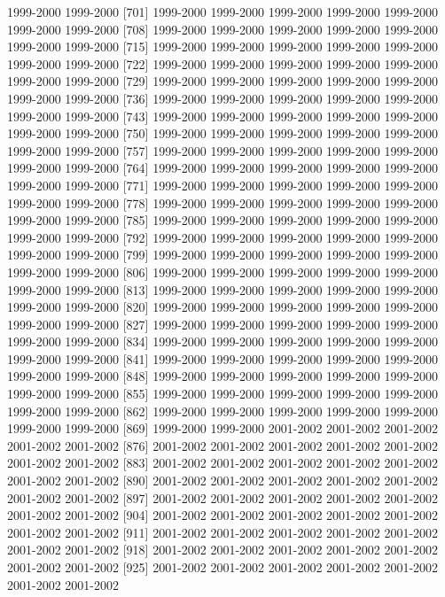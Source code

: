 \documentclass[
]{article}
\begin{document}
1999-2000 1999-2000 {[}701{]} 1999-2000 1999-2000 1999-2000 1999-2000
1999-2000 1999-2000 1999-2000 {[}708{]} 1999-2000 1999-2000 1999-2000
1999-2000 1999-2000 1999-2000 1999-2000 {[}715{]} 1999-2000 1999-2000
1999-2000 1999-2000 1999-2000 1999-2000 1999-2000 {[}722{]} 1999-2000
1999-2000 1999-2000 1999-2000 1999-2000 1999-2000 1999-2000 {[}729{]}
1999-2000 1999-2000 1999-2000 1999-2000 1999-2000 1999-2000 1999-2000
{[}736{]} 1999-2000 1999-2000 1999-2000 1999-2000 1999-2000 1999-2000
1999-2000 {[}743{]} 1999-2000 1999-2000 1999-2000 1999-2000 1999-2000
1999-2000 1999-2000 {[}750{]} 1999-2000 1999-2000 1999-2000 1999-2000
1999-2000 1999-2000 1999-2000 {[}757{]} 1999-2000 1999-2000 1999-2000
1999-2000 1999-2000 1999-2000 1999-2000 {[}764{]} 1999-2000 1999-2000
1999-2000 1999-2000 1999-2000 1999-2000 1999-2000 {[}771{]} 1999-2000
1999-2000 1999-2000 1999-2000 1999-2000 1999-2000 1999-2000 {[}778{]}
1999-2000 1999-2000 1999-2000 1999-2000 1999-2000 1999-2000 1999-2000
{[}785{]} 1999-2000 1999-2000 1999-2000 1999-2000 1999-2000 1999-2000
1999-2000 {[}792{]} 1999-2000 1999-2000 1999-2000 1999-2000 1999-2000
1999-2000 1999-2000 {[}799{]} 1999-2000 1999-2000 1999-2000 1999-2000
1999-2000 1999-2000 1999-2000 {[}806{]} 1999-2000 1999-2000 1999-2000
1999-2000 1999-2000 1999-2000 1999-2000 {[}813{]} 1999-2000 1999-2000
1999-2000 1999-2000 1999-2000 1999-2000 1999-2000 {[}820{]} 1999-2000
1999-2000 1999-2000 1999-2000 1999-2000 1999-2000 1999-2000 {[}827{]}
1999-2000 1999-2000 1999-2000 1999-2000 1999-2000 1999-2000 1999-2000
{[}834{]} 1999-2000 1999-2000 1999-2000 1999-2000 1999-2000 1999-2000
1999-2000 {[}841{]} 1999-2000 1999-2000 1999-2000 1999-2000 1999-2000
1999-2000 1999-2000 {[}848{]} 1999-2000 1999-2000 1999-2000 1999-2000
1999-2000 1999-2000 1999-2000 {[}855{]} 1999-2000 1999-2000 1999-2000
1999-2000 1999-2000 1999-2000 1999-2000 {[}862{]} 1999-2000 1999-2000
1999-2000 1999-2000 1999-2000 1999-2000 1999-2000 {[}869{]} 1999-2000
1999-2000 2001-2002 2001-2002 2001-2002 2001-2002 2001-2002 {[}876{]}
2001-2002 2001-2002 2001-2002 2001-2002 2001-2002 2001-2002 2001-2002
{[}883{]} 2001-2002 2001-2002 2001-2002 2001-2002 2001-2002 2001-2002
2001-2002 {[}890{]} 2001-2002 2001-2002 2001-2002 2001-2002 2001-2002
2001-2002 2001-2002 {[}897{]} 2001-2002 2001-2002 2001-2002 2001-2002
2001-2002 2001-2002 2001-2002 {[}904{]} 2001-2002 2001-2002 2001-2002
2001-2002 2001-2002 2001-2002 2001-2002 {[}911{]} 2001-2002 2001-2002
2001-2002 2001-2002 2001-2002 2001-2002 2001-2002 {[}918{]} 2001-2002
2001-2002 2001-2002 2001-2002 2001-2002 2001-2002 2001-2002 {[}925{]}
2001-2002 2001-2002 2001-2002 2001-2002 2001-2002 2001-2002 2001-2002
\end{document}
